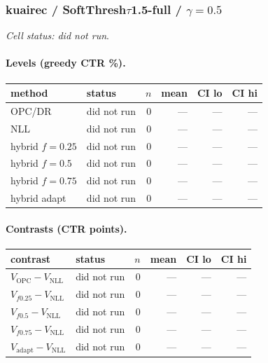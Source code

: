 \documentclass[10pt,a4paper]{article}
\begin{document}
\subsubsection{kuairec / SoftThresh$\tau$1.5-full / $\gamma=0.5$}
\emph{Cell status: did not run}.
\paragraph{Levels (greedy CTR \%).}
{\centering\small\begin{tabular}{llrrrr}
\toprule method & status & $n$ & mean & CI lo & CI hi \\
\midrule
OPC/DR & did not run & 0 & --- & --- & --- \\
NLL & did not run & 0 & --- & --- & --- \\
hybrid $f{=}0.25$ & did not run & 0 & --- & --- & --- \\
hybrid $f{=}0.5$ & did not run & 0 & --- & --- & --- \\
hybrid $f{=}0.75$ & did not run & 0 & --- & --- & --- \\
hybrid adapt & did not run & 0 & --- & --- & --- \\
\bottomrule\end{tabular}\par}
\paragraph{Contrasts (CTR points).}
{\centering\small\begin{tabular}{llrrrr}
\toprule contrast & status & $n$ & mean & CI lo & CI hi \\
\midrule
$V_{\mathrm{OPC}}-V_{\mathrm{NLL}}$ & did not run & 0 & --- & --- & --- \\
$V_{f0.25}-V_{\mathrm{NLL}}$ & did not run & 0 & --- & --- & --- \\
$V_{f0.5}-V_{\mathrm{NLL}}$ & did not run & 0 & --- & --- & --- \\
$V_{f0.75}-V_{\mathrm{NLL}}$ & did not run & 0 & --- & --- & --- \\
$V_{\mathrm{adapt}}-V_{\mathrm{NLL}}$ & did not run & 0 & --- & --- & --- \\
\bottomrule\end{tabular}\par}
\end{document}
